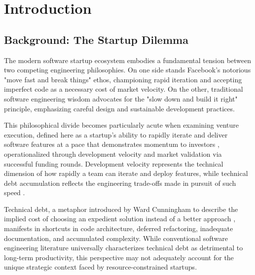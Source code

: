 \chapter{Introduction}\label{sec:introduction}

\section{Background: The Startup Dilemma}\label{sec:background}
The modern software startup ecosystem embodies a fundamental tension between two competing engineering philosophies. On one side stands Facebook's notorious "move fast and break things" ethos, championing rapid iteration and accepting imperfect code as a necessary cost of market velocity. On the other, traditional software engineering wisdom advocates for the "slow down and build it right" principle, emphasizing careful design and sustainable development practices.

This philosophical divide becomes particularly acute when examining venture execution, defined here as a startup's ability to rapidly iterate and deliver software features at a pace that demonstrates momentum to investors \citep{gompers2001venture, lee2024startups}, operationalized through development velocity and market validation via successful funding rounds. Development velocity represents the technical dimension of how rapidly a team can iterate and deploy features, while technical debt accumulation reflects the engineering trade-offs made in pursuit of such speed \citep{cunningham1992wycash, besker2018embracing}.

Technical debt, a metaphor introduced by Ward Cunningham to describe the implied cost of choosing an expedient solution instead of a better approach \citep{cunningham1992wycash}, manifests in shortcuts in code architecture, deferred refactoring, inadequate documentation, and accumulated complexity. While conventional software engineering literature universally characterizes technical debt as detrimental to long-term productivity, this perspective may not adequately account for the unique strategic context faced by resource-constrained startups.

